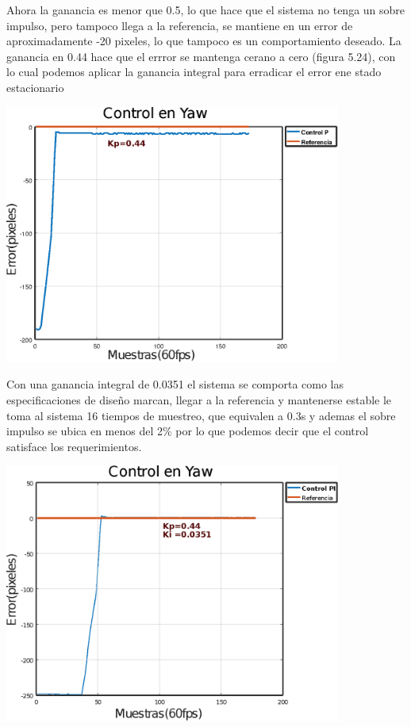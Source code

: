 Ahora la ganancia es menor que 0.5, lo que hace que el sistema no tenga un sobre impulso, pero tampoco llega 
a la referencia, se mantiene en un error de aproximadamente -20 pixeles, lo que tampoco es un comportamiento deseado.
La ganancia en 0.44 hace que el errror se mantenga cerano a cero (figura 5.24), con lo cual podemos aplicar la ganancia integral para erradicar el error ene stado estacionario 
\begin{center}
	\includegraphics[width=0.83\textwidth]{Contenido/Cuerpo/Capitulo5/Fig32.eps}
	\label{Fig4}
\end{center}
Con una ganancia integral de 0.0351 el sistema se comporta como las especificaciones de diseño marcan, llegar a la referencia y mantenerse estable le toma al sistema 16 tiempos de 
muestreo, que equivalen a 0.3s y ademas el sobre impulso se ubica en menos del 2\% por lo que podemos decir que el control satisface los requerimientos.
\begin{center}
	\includegraphics[width=0.83\textwidth]{Contenido/Cuerpo/Capitulo5/Fig33.eps}
	\label{Fig4}
\end{center}